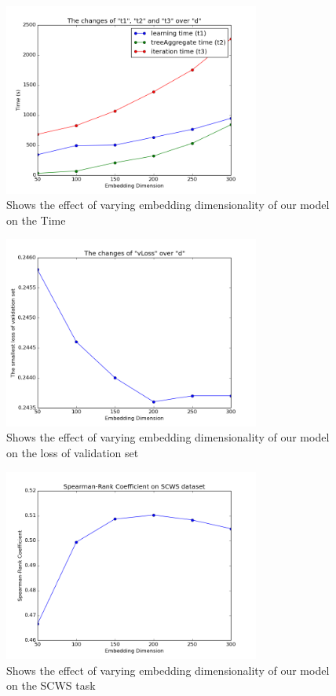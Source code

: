 \begin{figure}[tb]
  \centering
	\includegraphics[width=0.75\textwidth]{vectime} 
	\caption{Shows the effect of varying embedding dimensionality of our model on the Time}
	\label{fig:vectime}
\end{figure}

\begin{figure}[tb]
  \centering
	\includegraphics[width=0.75\textwidth]{vecloss} 
	\caption{Shows the effect of varying embedding dimensionality of our model on the loss of validation set}
	\label{fig:vecloss}
\end{figure}

\begin{figure}[!ht]
  \centering
	\includegraphics[width=0.75\textwidth]{vecSCWS} 
	\caption{Shows the effect of varying embedding dimensionality of our model on the SCWS task}
	\label{fig:vecSCWS}
\end{figure}


